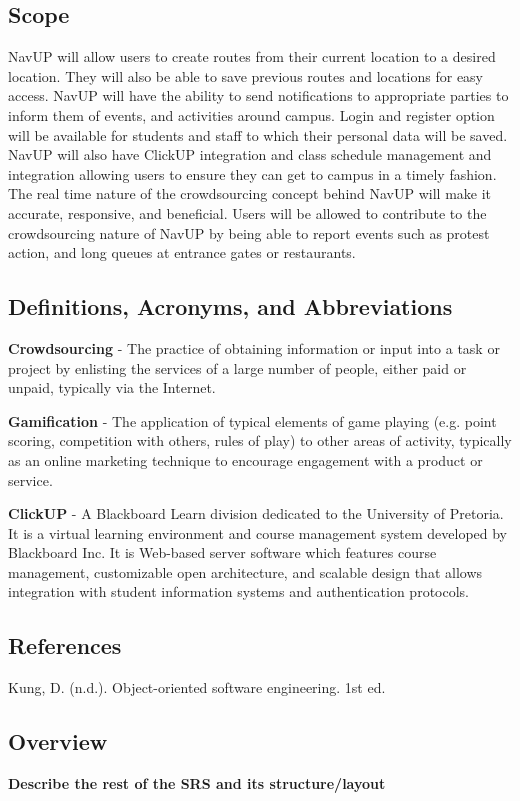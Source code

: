 \documentclass[12pt]{article}
\begin{document}
	\subsection{Scope}
		NavUP will allow users to create routes from their current location to a desired location. They will also be able to save previous routes and locations for easy access. NavUP will have the ability to send notifications to appropriate parties to inform them of events, and activities around campus. Login and register option will be available for students and staff to which their personal data will be saved. NavUP will also have ClickUP integration and class schedule management and integration allowing users to ensure they can get to campus in a timely fashion. 
The real time nature of the crowdsourcing concept behind NavUP will make it accurate, responsive, and beneficial.
Users will be allowed to contribute to the crowdsourcing nature of NavUP by being able to report events such as protest action, and long queues at entrance gates or restaurants.

	\subsection{Definitions, Acronyms, and Abbreviations}
		{\bfseries Crowdsourcing} - The practice of obtaining information or input into a task or project by enlisting the services of a large number of people, either paid or unpaid, typically via the Internet.
		
		{\bfseries Gamification} - The application of typical elements of game playing (e.g. point scoring, competition with others, rules of play) to other areas of activity, typically as an online marketing technique to encourage engagement with a product or service.

		{\bfseries ClickUP} - A Blackboard Learn division dedicated to the University of Pretoria. It is a virtual learning environment and course management system developed by Blackboard Inc. It is Web-based server software which features course management, customizable open architecture, and scalable design that allows integration with student information systems and authentication protocols.
		
	\subsection{References}
		Kung, D. (n.d.). Object-oriented software engineering. 1st ed.
		
	\subsection{Overview}
		{\bfseries Describe the rest of the SRS and its structure/layout}
\end{document}
